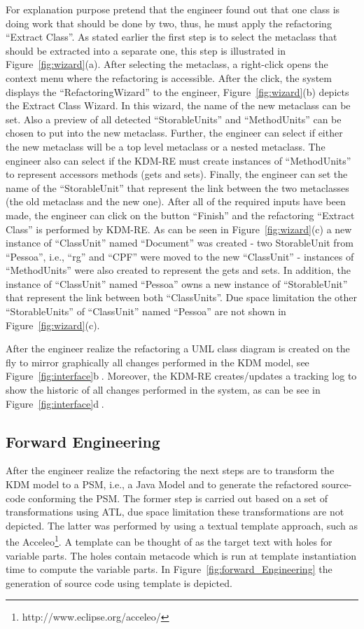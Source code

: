 For explanation purpose pretend that the engineer found out that one class is doing work that should be done by two, thus, he must apply the refactoring ``Extract Class''. As stated earlier the first step is to select the metaclass that should be extracted into a separate one, this step is illustrated in Figure~\ref{fig:wizard}(a). After selecting the metaclass, a right-click opens the context menu where the refactoring is accessible. After the click, the system displays the ``RefactoringWizard'' to the engineer, Figure~\ref{fig:wizard}(b) depicts the Extract Class Wizard. In this wizard, the name of the new metaclass can be set. Also a preview of all detected ``StorableUnits'' and ``MethodUnits'' can be chosen to put into the new metaclass. Further, the engineer can select if either the new metaclass will be a top level metaclass or a nested metaclass. The engineer also can select if the KDM-RE must create instances of ``MethodUnits'' to represent accessors methods (gets and sets). Finally, the engineer can set the name of the ``StorableUnit'' that represent the link between the two metaclasses (the old metaclass and the new one). After all of the required inputs have been made, the engineer can click on the button ``Finish'' and the refactoring ``Extract Class'' is performed by KDM-RE. As can be seen in Figure~\ref{fig:wizard}(c) a new instance of ``ClassUnit'' named ``Document'' was created - two StorableUnit from ``Pessoa'', i.e., ``rg'' and ``CPF'' were moved to the new ``ClassUnit'' - instances of ``MethodUnits'' were also created to represent the gets and sets. In addition, the instance of ``ClassUnit'' named ``Pessoa'' owns a new instance of ``StorableUnit'' that represent the link between both ``ClassUnits''. Due space limitation the other ``StorableUnits'' of ``ClassUnit'' named ``Pessoa'' are not shown in Figure~\ref{fig:wizard}(c).

After the engineer realize the refactoring a UML class diagram is created on the fly to mirror graphically all changes performed in the KDM model, see Figure~\ref{fig:interface}\textcircled{b}. Moreover, the KDM-RE creates/updates a tracking log to show the historic of all changes performed in the system, as can be see in Figure~\ref{fig:interface}\textcircled{d}. 

\subsection{Forward Engineering}
After the engineer realize the refactoring the next steps are to transform the KDM model to a PSM, i.e., a Java Model and to generate the refactored source-code conforming the PSM. The former step is carried out based on a set of transformations using ATL, due space limitation these transformations are not depicted. The latter was performed by using a textual template approach, such as the Acceleo\footnote{http://www.eclipse.org/acceleo/}. A template can be thought of as the target text with holes for variable parts. The holes contain metacode which is run at template instantiation time to compute the variable parts. In Figure~\ref{fig:forward_Engineering} the generation of source code using template is depicted.

